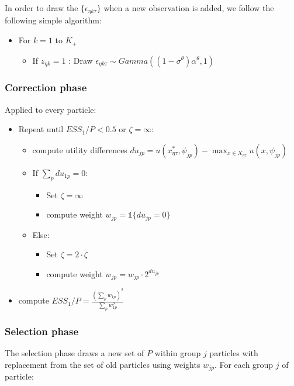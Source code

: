 \documentclass[12pt]{article}
\newcounter{thm}[section]
\begin{document}
In order to draw the $\{\epsilon_{\eta k \tau}\}$ when a new observation is added, we follow the following simple algorithm:

\begin{itemize}
	\item For $k=1$ to $K_+$
	\begin{itemize}
		\item If $z_{\eta k}=1$ : Draw $\epsilon_{\eta k \tau} \sim Gamma((1-\sigma^\theta) \alpha^\theta,1)$
	\end{itemize}
\end{itemize} 	


\subsubsection{Correction phase}\label{sec:correction}

Applied to every particle:

\begin{itemize}
\item Repeat until $ESS_1/P<0.5$ or $\zeta=\infty$:
	\begin{itemize}
		\item compute utility differences  $du_{jp} = u(x_{\eta \tau}^*,\psi_{jp}) - \max_{x \in X_{\eta \tau}} u(x,\psi_{jp})$
		\item If $\sum_p du_{1p} = 0$:
		\begin{itemize}
			\item Set $\zeta=\infty$
			\item compute weight $w_{jp} = \mathds{1}\{du_{jp}=0\}$
		\end{itemize}
		\item Else:
		\begin{itemize}
			\item Set $\zeta= 2 \cdot \zeta $
			\item compute weight $w_{jp} = w_{jp} \cdot 2^{ du_{jp}}$
		\end{itemize}
	\end{itemize}
	\item compute $ESS_1/P = \frac{(\sum_p w_{1p})^2}{\sum_p w_{1p}^2}$
\end{itemize}



\subsubsection{Selection phase}

The selection phase draws a new set of $P$ within group $j$ particles with replacement from the set of old particles using weights $w_{jp}$. For each group $j$ of particle:
\end{document}
